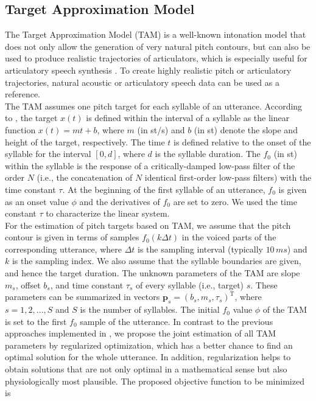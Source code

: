 \subsection{Target Approximation Model}
The Target Approximation Model (TAM) \cite{TAM1, TAM2} is a well-known intonation model that does not only allow the generation of very natural pitch contours, but can also be used to produce realistic trajectories of articulators, which is especially useful for articulatory speech synthesis \cite{VTL}. To create highly realistic pitch or articulatory trajectories, natural acoustic or articulatory speech data can be used as a reference.\\ 
The TAM assumes one pitch target for each syllable of an utterance. According to \cite{TO1}, the target $x(t)$ is defined within the interval of a syllable as the linear function $x(t)=mt+b$, where $m$ (in st/s) and $b$ (in st) denote the slope and height of the target, respectively. The time $t$ is defined relative to the onset of the syllable for the interval $[0,d]$, where $d$ is the syllable duration. The $f_{0}$ (in st) within the syllable is the response of a critically-damped low-pass filter of the order $N$ (i.e., the concatenation of $N$ identical first-order low-pass filters) with the time constant $\tau$. At the beginning of the first syllable of an utterance, $f_{0}$ is given as an onset value $\phi$ and the derivatives of $f_{0}$ are set to zero. We used the time constant $\tau$ to characterize the linear system.\\
For the estimation of pitch targets based on TAM, we assume that the pitch contour is given in terms of samples $f_{0}(k\Delta t)$ in the voiced parts of the corresponding utterance, where $\Delta t$ is the sampling interval (typically $10\,ms$) and $k$ is the sampling index. We also assume that the syllable boundaries are given, and hence the target duration. The unknown parameters of the TAM are slope $m_{s}$, offset $b_{s}$, and time constant $\tau _{s}$ of every syllable (i.e., target) $s$. These parameters can be summarized in vectors $\mathbf{p}_{s}=(b_{s},m_{s},\tau_{s})^{\mathrm{T}}$, where $s=1,2,\dots,S$ and $S$ is the number of syllables. The initial $f_{0}$ value $\phi$ of the TAM is set to the first $f_{0}$ sample of the utterance. In contrast to the previous approaches implemented in \cite{TAM2}, we propose the joint estimation of all TAM parameters by regularized optimization, which has a better chance to find an optimal solution for the whole utterance. In addition, regularization helps to obtain solutions that are not only optimal in a mathematical sense but also physiologically most plausible. The proposed objective function to be minimized is

